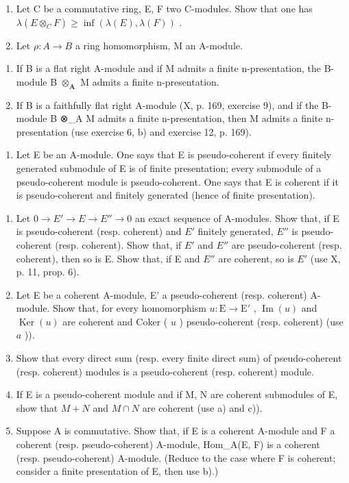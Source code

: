 \begin{enumerate}
\def\labelenumi{\arabic{enumi})}
\setcounter{enumi}{7}
\tightlist
\item
  Let C be a commutative ring, E, F two C-modules. Show that one has \(\lambda(E \otimes_{C} F) \geqslant \inf(\lambda(E), \lambda(F))\) .
\item
  Let \(\rho: A \to B\) a ring homomorphism, M an A-module.
\end{enumerate}

\begin{enumerate}
\def\labelenumi{\alph{enumi})}
\item
  If B is a flat right A-module and if M admits a finite n-presentation, the B-module B \(\otimes_{\mathbf{A}}\) M admits a finite n-presentation.
\item
  If B is a faithfully flat right A-module (X, p. 169, exercise 9), and if the B-module B ⊗\_A M admits a finite n-presentation, then M admits a finite n-presentation (use exercise 6, b) and exercise 12, p. 169).
\end{enumerate}

\begin{enumerate}
\def\labelenumi{\arabic{enumi})}
\setcounter{enumi}{9}
\tightlist
\item
  Let E be an A-module. One says that E is pseudo-coherent if every finitely generated submodule of E is of finite presentation; every submodule of a pseudo-coherent module is pseudo-coherent. One says that E is coherent if it is pseudo-coherent and finitely generated (hence of finite presentation).
\end{enumerate}

\begin{enumerate}
\def\labelenumi{\alph{enumi})}
\item
  Let \(0 \to E' \to E \to E'' \to 0\) an exact sequence of A-modules. Show that, if E is pseudo-coherent (resp. coherent) and \(E'\) finitely generated, \(E''\) is pseudo-coherent (resp. coherent). Show that, if \(E'\) and \(E''\) are pseudo-coherent (resp. coherent), then so is E. Show that, if E and \(E''\) are coherent, so is \(E'\) (use X, p. 11, prop. 6).
\item
  Let E be a coherent A-module, E' a pseudo-coherent (resp. coherent) A-module. Show that, for every homomorphism \(u: \mathrm{E} \to \mathrm{E}'\) , \(\operatorname{Im}(u)\) and \(\operatorname{Ker}(u)\) are coherent and Coker ( \(u\) ) pseudo-coherent (resp. coherent) (use \(a\) )).
\item
  Show that every direct sum (resp. every finite direct sum) of pseudo-coherent (resp. coherent) modules is a pseudo-coherent (resp. coherent) module.
\item
  If E is a pseudo-coherent module and if M, N are coherent submodules of E, show that \(M + N\) and \(M \cap N\) are coherent (use a) and c)).
\item
  Suppose A is commutative. Show that, if E is a coherent A-module and F a coherent (resp. pseudo-coherent) A-module, Hom\_A(E, F) is a coherent (resp. pseudo-coherent) A-module. (Reduce to the case where F is coherent; consider a finite presentation of E, then use b).)
\end{enumerate}


